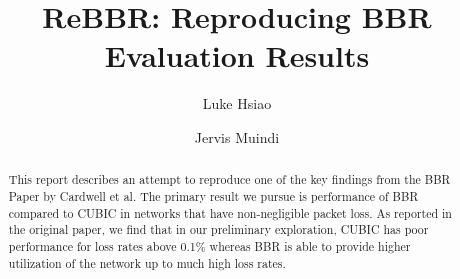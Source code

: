 \documentclass[sigconf]{acmart}
\begin{document}
\title{ReBBR: Reproducing BBR Evaluation Results}

\author{Luke Hsiao}

\author{Jervis Muindi}


\begin{abstract}
This report describes an attempt to reproduce one of the key
findings from the BBR Paper by Cardwell et al. The primary
result we pursue is performance of BBR compared to CUBIC in
networks that have non-negligible packet loss. As reported
in the original paper, we find that in our preliminary exploration,
CUBIC has poor performance for loss rates above 0.1\% whereas BBR is able
to provide higher utilization of the network up to much high loss rates.
\end{abstract}




\maketitle







\end{document}

